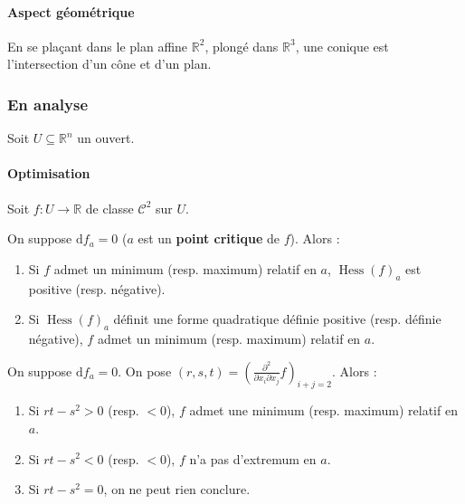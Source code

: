   \paragraph{Aspect géométrique}


  \begin{proposition}
    En se plaçant dans le plan affine $\mathbb{R}^2$, plongé dans $\mathbb{R}^3$, une conique est l'intersection d'un cône et d'un plan.
  \end{proposition}

  \subsubsection{En analyse}

  Soit $U \subseteq \mathbb{R}^n$ un ouvert.

  \paragraph{Optimisation}

  Soit $f : U \rightarrow \mathbb{R}$ de classe $\mathcal{C}^2$ sur $U$.


  \begin{theorem}
    On suppose $\mathrm{d}f_a = 0$ ($a$ est un \textbf{point critique} de $f$). Alors :
    \begin{enumerate}[label=(\roman*)]
      \item Si $f$ admet un minimum (resp. maximum) relatif en $a$, $\operatorname{Hess}(f)_a$ est positive (resp. négative).
      \item Si $\operatorname{Hess}(f)_a$ définit une forme quadratique définie positive (resp. définie négative), $f$ admet un minimum (resp. maximum) relatif en $a$.
    \end{enumerate}
  \end{theorem}

  \begin{example}
    On suppose $\mathrm{d}f_a = 0$. On pose $(r,s,t) = \left(  \frac{\partial^2}{\partial x_i \partial x_j} f \right)_{i+j=2}$. Alors :
    \begin{enumerate}[label=(\roman*)]
      \item Si $rt-s^2 > 0$ (resp. $< 0$), $f$ admet une minimum (resp. maximum) relatif en $a$.
      \item Si $rt-s^2 < 0$ (resp. $< 0$), $f$ n'a pas d'extremum en $a$.
      \item Si $rt-s^2 = 0$, on ne peut rien conclure.
    \end{enumerate}
  \end{example}

